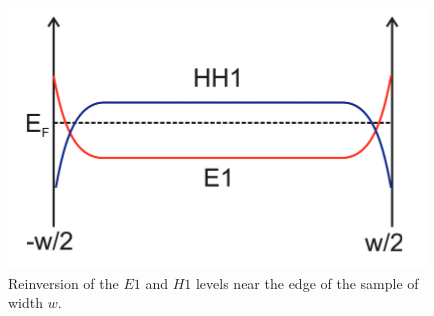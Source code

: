 \begin{figure}[h!]
    \includegraphics[scale=0.8]{sections/visuel/cross}
    \caption{Reinversion of the $E1$ and $H1$ levels near the edge of the sample of width $w$.}
    \label{cross}
\end{figure}